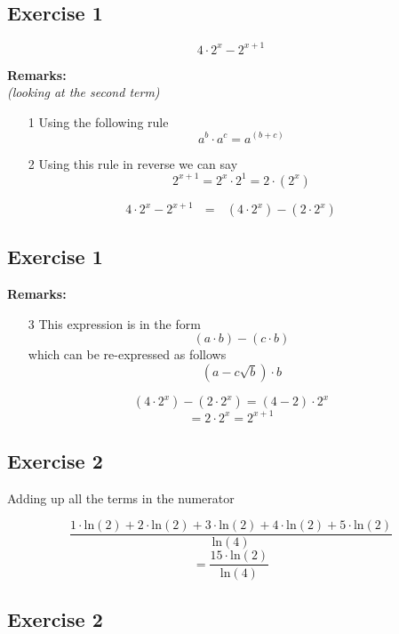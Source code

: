 \subsection{Exercise 1}

\[ 4 \cdot 2^x - 2^{x+1} \]

\textbf{Remarks:}\\
\textit{(looking at the second term)}
\begin{itemize}
\item[1] Using the following rule
\[ a^b \cdot a^c = a^{(b+c)}  \] 
\item[2] Using this rule in reverse we can say
\[ 2^{x+1} = 2^x \cdot 2^1  = 2\cdot (2^x) \] 
\end{itemize}
\[ 4 \cdot 2^x - 2^{x+1} \mbox{   } = \mbox{   } (4 \cdot 2^x) -  (2\cdot 2^{x}) \]

\subsection{Exercise 1}


\textbf{Remarks:}
\begin{itemize}
\item[3] This expression is in the form 
\[ (a  \cdot b ) - ( c  \cdot b) \]
which can be re-expressed as follows 
\[ (a - c\sqrt{b} )  \cdot b \]
\end{itemize}
\[ (4 \cdot 2^x) -  (2\cdot 2^{x}) = (4-2)  \cdot 2^{x} \]
\[   = 2 \cdot 2^x = 2^{x+1}\]

\subsection{Exercise 2}

Adding up all the terms in the numerator

\[  \frac{1\cdot\mbox{ln}(2) + 2 \cdot \mbox{ln}(2) + 3 \cdot\mbox{ln}(2)  + 4 \cdot \mbox{ln}(2) + 5 \cdot \mbox{ln}(2)  }  {\mbox{ln}(4)} \]  \[= \frac{15 \cdot \mbox{ln}(2) }{\mbox{ln}(4)} \]



\subsection{Exercise 2}

